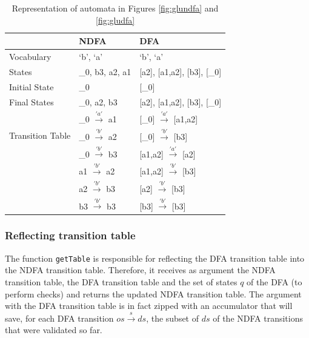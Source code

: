 \begin{table}
  \begin{center}
    \begin{tabular}{ | p{3cm} |p{4cm}||p{4cm}|  }
    \hline
         & NDFA & DFA \\ [1ex]
        \hline
        \hline
        Vocabulary & `b', `a' & `b', `a'\\ [0.7ex]
        \hline
        States & \_0, b3, a2, a1 & [a2], [a1,a2], [b3], [\_0]\\ [0.7ex]
        \hline
        Initial State & \_0 & [\_0] \\ [0.7ex]
        \hline
        Final States & \_0, a2, b3 & [a2], [a1,a2], [b3], [\_0] \\ [0.7ex]
        \hline
        \multirow{3}{5em}{Transition Table} & \_0 $\xrightarrow{'a'}$ a1 & [\_0] $\xrightarrow{'a'}$ [a1,a2]\\
        & \_0 $\xrightarrow{'b'}$ a2 & [\_0]    $\xrightarrow{'b'}$ [b3]\\
        & \_0 $\xrightarrow{'b'}$ b3 & [a1,a2]  $\xrightarrow{'a'}$ [a2]\\
        & a1  $\xrightarrow{'b'}$ a2 & [a1,a2]  $\xrightarrow{'b'}$ [b3]\\
        & a2  $\xrightarrow{'b'}$ b3 & [a2]     $\xrightarrow{'b'}$ [b3]\\
        & b3  $\xrightarrow{'b'}$ b3 & [b3]     $\xrightarrow{'b'}$ [b3]\\
        \hline
        \end{tabular}
  \end{center}
  \caption{Representation of automata in Figures \ref{fig:glundfa} and \ref{fig:gludfa}}
  \label{tablestruct}
\end{table}

\subsubsection{Reflecting transition table}
The function \texttt{getTable} is responsible for reflecting the DFA transition table into the NDFA transition table. Therefore, it receives as argument the NDFA transition table, the DFA transition table and the set of states $q$ of the DFA (to perform checks) and returns the updated NDFA transition table. The argument with the DFA transition table is in fact zipped with an accumulator that will save, for each DFA transition $os \xrightarrow{s} ds$, the subset of $ds$ of the NDFA transitions that were validated so far. 

